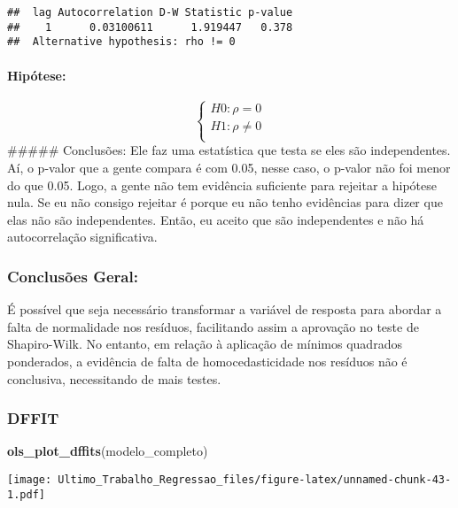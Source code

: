 \documentclass[
]{article}
\newenvironment{Shaded}{\begin{snugshade}}{\end{snugshade}}
\newcommand{\FunctionTok}[1]{\textcolor[rgb]{0.13,0.29,0.53}{\textbf{#1}}}
\newcommand{\NormalTok}[1]{#1}
\begin{document}
\begin{verbatim}
##  lag Autocorrelation D-W Statistic p-value
##    1      0.03100611      1.919447   0.378
##  Alternative hypothesis: rho != 0
\end{verbatim}

\hypertarget{hipuxf3tese-6}{%
\paragraph{Hipótese:}\label{hipuxf3tese-6}}

\[
\left\{ \begin{array}{rc} 
H0: 𝜌 = 0 \\ 
H1: 𝜌 \neq 0 \\ 
\end{array}\right.
\] \#\#\#\#\# Conclusões: Ele faz uma estatística que testa se eles são
independentes. Aí, o p-valor que a gente compara é com 0.05, nesse caso,
o p-valor não foi menor do que 0.05. Logo, a gente não tem evidência
suficiente para rejeitar a hipótese nula. Se eu não consigo rejeitar é
porque eu não tenho evidências para dizer que elas não são
independentes. Então, eu aceito que são independentes e não há
autocorrelação significativa.

\hypertarget{conclusuxf5es-geral}{%
\subsubsection{Conclusões Geral:}\label{conclusuxf5es-geral}}

É possível que seja necessário transformar a variável de resposta para
abordar a falta de normalidade nos resíduos, facilitando assim a
aprovação no teste de Shapiro-Wilk. No entanto, em relação à aplicação
de mínimos quadrados ponderados, a evidência de falta de
homocedasticidade nos resíduos não é conclusiva, necessitando de mais
testes.

\hypertarget{dffit}{%
\subsubsection{DFFIT}\label{dffit}}

\begin{Shaded}
\begin{Highlighting}[]
\FunctionTok{ols\_plot\_dffits}\NormalTok{(modelo\_completo)}
\end{Highlighting}
\end{Shaded}

\texttt{[image: Ultimo\_Trabalho\_Regressao\_files/figure-latex/unnamed-chunk-43-1.pdf]}
\end{document}
